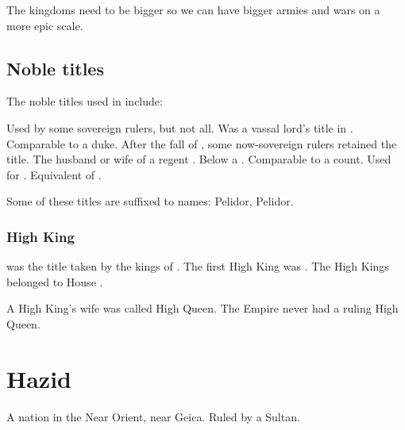The kingdoms need to be bigger so we can have bigger armies and wars on a more epic scale. 










\subsection{Noble titles}
The noble titles used in \Velcad{} include:

\begin{gloss}
    Used by some sovereign rulers, but not all. 
  \gitemnoindex{\Rayuth{}} 
    Was a vassal lord's title in \GreatVelcad. 
    Comparable to a duke. 
    After the fall of \GreatVelcad, some now-sovereign rulers retained the title. 
  \gitemnoindex{\Rinyuth{}}
    The husband or wife of a regent \rayuth{}. 
  \gitemnoindex{\Scarv{}}
    Below a \rayuth{}. 
    Comparable to a count. 
  \gitemnoindex{\Rah{}} 
    Used for . Equivalent of . 
\end{gloss}

Some of these titles are suffixed to names: 
\Rayuth[\Icor] Pelidor, \rah[\Sethgal] Pelidor. 








\subsubsection{High King}
 was the title taken by the kings of \theBelkadianEmpire. 
The first High King was . 
The High Kings belonged to House \Velcad. 

A High King's wife was called High Queen. The Empire never had a ruling High Queen.















\section{Hazid}
A nation in the Near Orient, near Geica. Ruled by a Sultan. 















